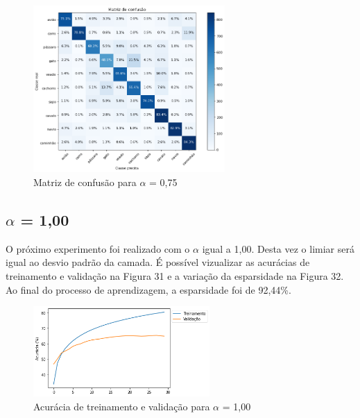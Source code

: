 \begin{figure}[H]
	\includegraphics[width=0.65\textwidth, keepaspectratio=true]{figuras/CAP4/cm075_.png}
	\centering
	\caption[Matriz de confusão para $\alpha$ = 0,75]{Matriz de confusão para $\alpha$ = 0,75}
\end{figure}




\subsection{$\alpha$ = 1,00}
O próximo experimento foi realizado com o $\alpha$ igual a 1,00. Desta vez o limiar será igual ao desvio padrão da camada. É possível vizualizar as acurácias de treinamento e validação na Figura 31 e a variação da esparsidade na Figura 32. Ao final do processo de aprendizagem, a esparsidade foi de 92,44\%.

\begin{figure}[H]
	\includegraphics[width=0.6\textwidth, keepaspectratio=true]{figuras/CAP4/acuracia10.png}
	\centering
	\caption[Acurácia de treinamento e validação para $\alpha$ = 1,00]{Acurácia de treinamento e validação para $\alpha$ = 1,00}
\end{figure}

